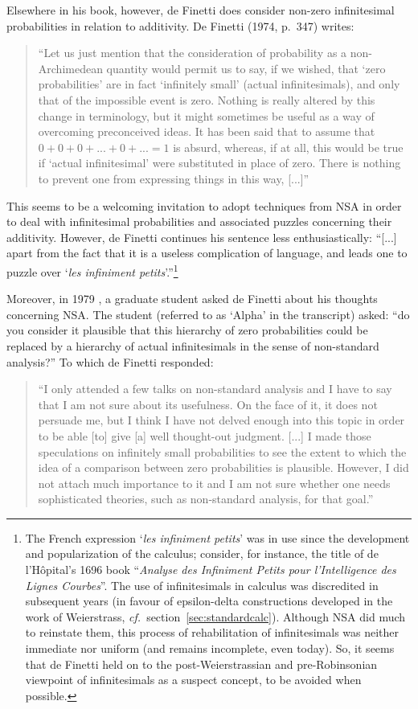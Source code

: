 Elsewhere in his book, however, de Finetti does consider non-zero infinitesimal probabilities in relation to additivity.
De Finetti (1974, p.~347) writes:
\begin{quote}
``Let us just mention that the consideration of probability as a non-Archimedean quantity would permit us to say, if we wished, that `zero probabilities' are in fact `infinitely small' (actual infinitesimals), and only that of the impossible event is zero. Nothing is really altered by this change in terminology, but it might sometimes be useful as a way of overcoming preconceived ideas. It has been said that to assume that $0+0+0+ ... +0+ ... =1$ is absurd, whereas, if at all, this would be true if `actual infinitesimal' were substituted in place of zero. There is nothing to prevent one from expressing things in this way, [...]''
\end{quote}
This seems to be a welcoming invitation to adopt techniques from NSA in order to deal with infinitesimal probabilities and associated puzzles concerning their additivity. However, de Finetti continues his sentence less enthusiastically:
``[...] apart from the fact that it is a useless complication of language, and leads one to puzzle over `\textit{les infiniment petits}'.''\footnote{The French expression `\textit{les infiniment petits}' was in use since the development and popularization of the calculus; consider, for instance, the title of de l'H{\^o}pital's 1696 book ``\textit{Analyse des Infiniment Petits pour l'Intelligence des Lignes Courbes}''. The use of infinitesimals in calculus was discredited in subsequent years (in favour of epsilon-delta constructions developed in the work of Weierstrass, \textit{cf.}\ section~\ref{sec:standardcalc}). Although NSA did much to reinstate them, this process of rehabilitation of infinitesimals was neither immediate nor uniform (and remains incomplete, even today). So, it seems that de Finetti held on to the post-Weierstrassian and pre-Robinsonian viewpoint of infinitesimals as a suspect concept, to be avoided when possible.}

Moreover, in 1979 \citep[as transcribed in][Ch.~12, p.~122]{deFinetti:2008}, a graduate student asked de Finetti about his thoughts concerning NSA. The student (referred to as `Alpha' in the transcript) asked: ``do you consider it plausible that this hierarchy of zero probabilities could be replaced by a hierarchy of actual infinitesimals in the sense of non-standard analysis?'' To which de Finetti responded:
\begin{quote}
``I only attended a few talks on non-standard analysis and I have to say that I am not sure about its usefulness. On the face of it, it does not persuade me, but I think I have not delved enough into this topic in order to be able [to] give [a] well thought-out judgment. [...] I made those speculations on infinitely small probabilities to see the extent to which the idea of a comparison between zero probabilities is plausible. However, I did not attach much importance to it and I am not sure whether one needs sophisticated theories, such as non-standard analysis, for that goal.''
\end{quote}

